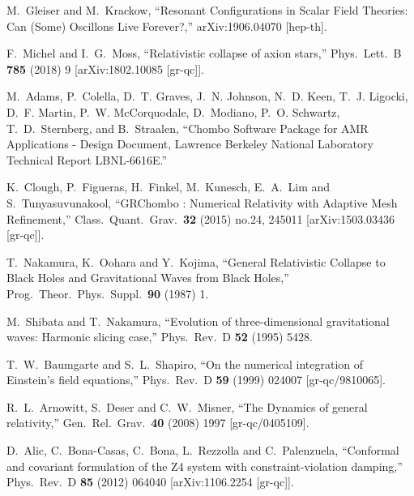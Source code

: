\documentclass[11pt,a4paper]{article}
\begin{document}
\begin{thebibliography}{99}
  M.~Gleiser and M.~Krackow,
  ``Resonant Configurations in Scalar Field Theories: Can (Some) Oscillons Live Forever?,''
  arXiv:1906.04070 [hep-th].
  
  F.~Michel and I.~G.~Moss,
  ``Relativistic collapse of axion stars,''
  Phys.\ Lett.\ B {\bf 785} (2018) 9
  [arXiv:1802.10085 [gr-qc]].
  
M.~Adams, P.~Colella, D.~T. Graves, J.~N. Johnson, N.~D. Keen, T.~J. Ligocki, D.~F. Martin, 
P.~W. McCorquodale, D.~Modiano, P.~O. Schwartz, T.~D.~Sternberg, and B.~Straalen,     
``Chombo Software Package for AMR Applications - Design Document,
   Lawrence Berkeley National Laboratory Technical Report LBNL-6616E.''

K.~Clough, P.~Figueras, H.~Finkel, M.~Kunesch, E.~A.~Lim and S.~Tunyasuvunakool,
  ``GRChombo : Numerical Relativity with Adaptive Mesh Refinement,''
  Class.\ Quant.\ Grav.\  {\bf 32} (2015) no.24,  245011
  [arXiv:1503.03436 [gr-qc]].
  
  T.~Nakamura, K.~Oohara and Y.~Kojima,
  ``General Relativistic Collapse to Black Holes and Gravitational Waves from Black Holes,''
  Prog.\ Theor.\ Phys.\ Suppl.\  {\bf 90} (1987) 1.
  
  M.~Shibata and T.~Nakamura,
  ``Evolution of three-dimensional gravitational waves: Harmonic slicing case,''
  Phys.\ Rev.\ D {\bf 52} (1995) 5428.
  
  T.~W.~Baumgarte and S.~L.~Shapiro,
  ``On the numerical integration of Einstein's field equations,''
  Phys.\ Rev.\ D {\bf 59} (1999) 024007
  [gr-qc/9810065].
  
  R.~L.~Arnowitt, S.~Deser and C.~W.~Misner,
  ``The Dynamics of general relativity,''
  Gen.\ Rel.\ Grav.\  {\bf 40} (2008) 1997
  [gr-qc/0405109].
  
  D.~Alic, C.~Bona-Casas, C.~Bona, L.~Rezzolla and C.~Palenzuela,
  ``Conformal and covariant formulation of the Z4 system with constraint-violation damping,''
  Phys.\ Rev.\ D {\bf 85} (2012) 064040
  [arXiv:1106.2254 [gr-qc]].
  

\end{thebibliography}
\end{document}
